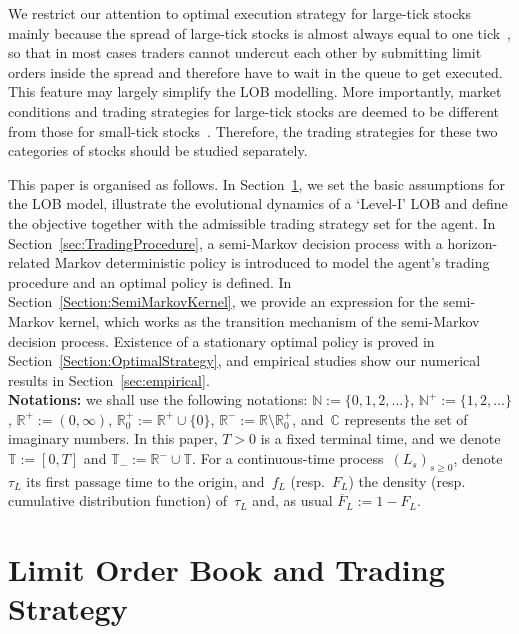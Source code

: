 \documentclass{amsart}[11pt]
\numberwithin{equation}{section}
\theoremstyle{definition}
\newcommand{\RR}{\mathbb{R}}
\newcommand{\NN}{\mathbb{N}}
\newcommand{\CC}{\mathbb{C}}
\newcommand{\TT}{\mathbb{T}}
\begin{document}
We restrict our attention to optimal execution strategy for large-tick stocks 
mainly because the spread of large-tick stocks is almost always equal to one tick~\cite{dayri2015large}, 
so that in most cases traders cannot undercut each other by submitting limit orders inside the spread and therefore have to wait in the queue to get executed. 
This feature may largely simplify the LOB modelling. 
More importantly, market conditions and trading strategies for large-tick stocks are deemed to be different from those for small-tick stocks~\cite{o2015relative}. 
Therefore, the trading strategies for these two categories of stocks should be studied separately.

This paper is organised as follows. 
In Section~\ref{sec:stylisedLOB}, 
we set the basic assumptions for the LOB model, illustrate the evolutional dynamics of a `Level-I' LOB and define the objective together with the admissible trading strategy set for the agent.
In Section~\ref{sec:TradingProcedure}, 
a semi-Markov decision process with a horizon-related Markov deterministic policy is introduced to model the agent's trading procedure and an optimal policy is defined. 
In Section~\ref{Section:SemiMarkovKernel}, we provide an expression for the semi-Markov kernel,
which works as the transition mechanism of the semi-Markov decision process. 
Existence of a stationary optimal policy is proved in Section~\ref{Section:OptimalStrategy}, 
and empirical studies show our numerical results in Section~\ref{sec:empirical}.
\\

\noindent\textbf{Notations:}\label{notations}
we shall use the following notations:
$\NN := \{0, 1, 2, \dots\}$, 
$\NN^+ := \{1, 2, \dots\}$, 
$\RR^+:=(0,\infty)$, $\RR^+_0:=\RR^+\cup\{0\}$, $\RR^-:=\RR\setminus\RR^+_0$,
and~$\CC$ represents the set of imaginary numbers.
In this paper, $T>0$ is a fixed terminal time, and we denote
$\TT := [0,T]$ and $\TT_- := \RR^-\!\cup\TT$.
For a continuous-time process~$({L}_s)_{s\geq 0}$, 
denote~$\tau_{{L}}$ its first passage time to the origin, 
and~$f_L$ (resp.~$F_L$) the density (resp. cumulative distribution function) of~$\tau_{L}$ and, as usual $\overline{F}_L := 1-F_L$.

\section{Limit Order Book and Trading Strategy}\label{sec:stylisedLOB}
\end{document}
